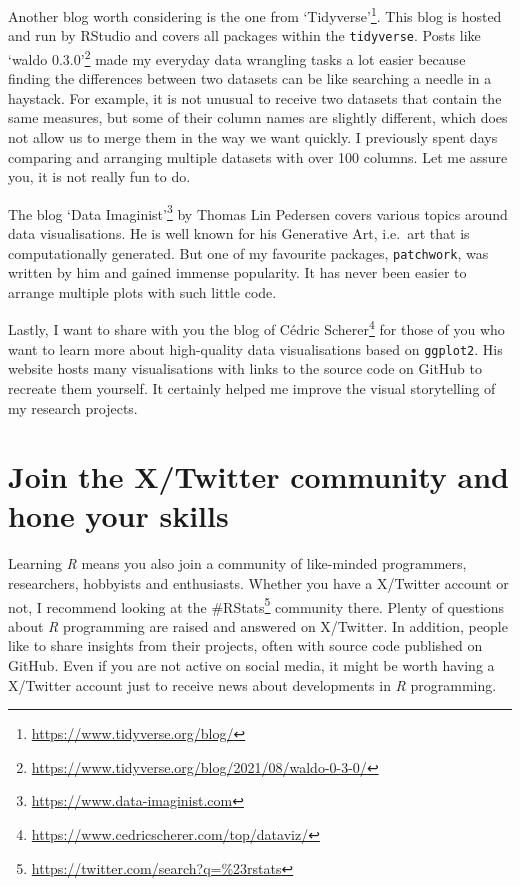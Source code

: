 \documentclass[
  letterpaper,
]{krantz}
\renewcommand{\href}[2]{#2\footnote{\url{#1}}}
\begin{document}
Another blog worth considering is the one from
\href{https://www.tidyverse.org/blog/}{`Tidyverse'}. This blog is hosted
and run by RStudio and covers all packages within the
\texttt{tidyverse}. Posts like
\href{https://www.tidyverse.org/blog/2021/08/waldo-0-3-0/}{`waldo
0.3.0'} made my everyday data wrangling tasks a lot easier because
finding the differences between two datasets can be like searching a
needle in a haystack. For example, it is not unusual to receive two
datasets that contain the same measures, but some of their column names
are slightly different, which does not allow us to merge them in the way
we want quickly. I previously spent days comparing and arranging
multiple datasets with over 100 columns. Let me assure you, it is not
really fun to do.

The blog \href{https://www.data-imaginist.com}{`Data Imaginist'} by
Thomas Lin Pedersen covers various topics around data visualisations. He
is well known for his Generative Art, i.e.~art that is computationally
generated. But one of my favourite packages, \texttt{patchwork}, was
written by him and gained immense popularity. It has never been easier
to arrange multiple plots with such little code.

Lastly, I want to share with you the
\href{https://www.cedricscherer.com/top/dataviz/}{blog of Cédric
Scherer} for those of you who want to learn more about high-quality data
visualisations based on \texttt{ggplot2}. His website hosts many
visualisations with links to the source code on GitHub to recreate them
yourself. It certainly helped me improve the visual storytelling of my
research projects.

\section{Join the X/Twitter community and hone your
skills}\label{sec-next-steps-twitter}

Learning \emph{R} means you also join a community of like-minded
programmers, researchers, hobbyists and enthusiasts. Whether you have a
X/Twitter account or not, I recommend looking at the
\href{https://twitter.com/search?q=\%23rstats}{\#RStats} community
there. Plenty of questions about \emph{R} programming are raised and
answered on X/Twitter. In addition, people like to share insights from
their projects, often with source code published on GitHub. Even if you
are not active on social media, it might be worth having a X/Twitter
account just to receive news about developments in \emph{R} programming.
\end{document}
